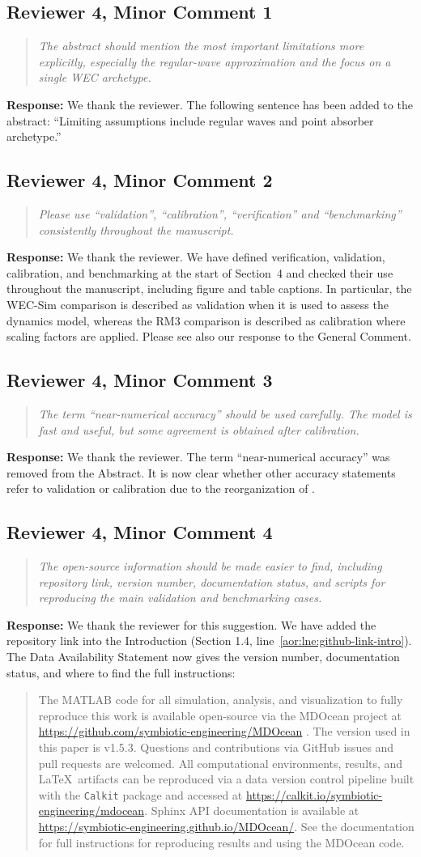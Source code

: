 \documentclass[11pt]{article}
\newcommand{\rcomment}[2]{\subsection*{#1}\begin{quote}\itshape #2\end{quote}}
\newcommand{\response}{\noindent\textbf{Response:} }
\begin{document}
\rcomment{Reviewer 4, Minor Comment 1}{The abstract should mention the most important limitations more explicitly, especially the regular-wave approximation and the focus on a single WEC archetype.}
\response We thank the reviewer.
The following sentence has been added to the abstract:
``Limiting assumptions include regular waves and point absorber archetype.''

\rcomment{Reviewer 4, Minor Comment 2}{Please use ``validation'', ``calibration'', ``verification'' and ``benchmarking'' consistently throughout the manuscript.}
\response We thank the reviewer. We have defined verification, validation, calibration, and benchmarking at the start of Section~4 and checked their use throughout the manuscript, including figure and table captions. In particular, the WEC-Sim comparison is described as validation when it is used to assess the dynamics model, whereas the RM3 comparison is described as calibration where scaling factors are applied. Please see also our response to the General Comment.

\rcomment{Reviewer 4, Minor Comment 3}{The term ``near-numerical accuracy'' should be used carefully. The model is fast and useful, but some agreement is obtained after calibration.}
\response We thank the reviewer.
The term ``near-numerical accuracy'' was removed from the Abstract.
It is now clear whether other accuracy statements refer to validation or calibration due to the reorganization of .

\rcomment{Reviewer 4, Minor Comment 4}{The open-source information should be made easier to find, including repository link, version number, documentation status, and scripts for reproducing the main validation and benchmarking cases.}
\response We thank the reviewer for this suggestion.
We have added the repository link into the Introduction (Section 1.4, line~\ref{aor:lne:github-link-intro}).
The Data Availability Statement now gives the version number, documentation status, and where to find the full instructions:
\begin{quote}
  The MATLAB code for all simulation, analysis, and visualization to fully reproduce this work is available open-source via the MDOcean project at
  \url{https://github.com/symbiotic-engineering/MDOcean} \citep{aor:mccabe_mdocean_2024}.
  The version used in this paper is v1.5.3.
  Questions and contributions via GitHub issues and pull requests are welcomed.
  All computational environments, results, and \LaTeX~artifacts can be reproduced via a data version control pipeline built with the \texttt{Calkit} package
  and accessed at \url{https://calkit.io/symbiotic-engineering/mdocean}.
  Sphinx API documentation is available at \url{https://symbiotic-engineering.github.io/MDOcean/}.
  See the documentation for full instructions for reproducing results and using the MDOcean code.
\end{quote}
\end{document}
